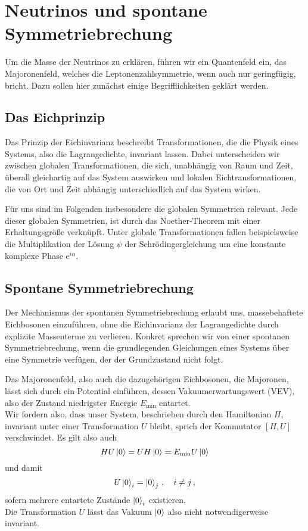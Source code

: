 \section{Neutrinos und spontane Symmetriebrechung}

Um die Masse der Neutrinos zu erklären, führen wir ein Quantenfeld ein, das Majoronenfeld, welches die Leptonenzahlsymmetrie, wenn auch nur geringfügig, bricht.
Dazu sollen hier zunächst einige Begrifflichkeiten geklärt werden.

\subsection{Das Eichprinzip} %

Das Prinzip der Eichinvarianz beschreibt Transformationen, die die Physik eines Systems, also die Lagrangedichte, invariant lassen.
Dabei unterscheiden wir zwischen globalen Transformationen, die sich, unabhängig von Raum und Zeit, überall gleichartig auf das System auswirken und lokalen Eichtransformationen, 
die von Ort und Zeit abhängig unterschiedlich auf das System wirken.

Für uns sind im Folgenden insbesondere die globalen Symmetrien relevant.
Jede dieser globalen Symmetrien, ist durch das Noether-Theorem mit einer Erhaltungsgröße verknüpft.
Unter globale Transformationen fallen beispielsweise die Multiplikation der Lösung $\psi$ der Schrödingergleichung um eine konstante komplexe Phase $\mathrm{e}^{i \alpha}$.

\subsection{Spontane Symmetriebrechung} %


Der Mechanismus der spontanen Symmetriebrechung erlaubt uns, massebehaftete Eichbosonen einzuführen, ohne die Eichinvarianz der Lagrangedichte durch explizite Massenterme zu verlieren.
Konkret sprechen wir von einer spontanen Symmetriebrechung, wenn die grundlegenden Gleichungen eines Systems über eine Symmetrie verfügen, der der Grundzustand nicht folgt.

Das Majoronenfeld, also auch die dazugehörigen Eichbosonen, die Majoronen, lässt sich durch ein Potential einführen, dessen Vakuumerwartungswert (VEV), also der Zustand niedrigster Energie $E_\text{min}$ entartet. \\
Wir fordern also, dass unser System, beschrieben durch den Hamiltonian $H$, invariant unter einer Transformation $U$ bleibt, sprich der Kommutator $[H, U]$ verschwindet.
Es gilt also auch
\begin{equation*}
    H U \ket{0} = U H \ket{0} = E_\text{min} U  \ket{0} 
\end{equation*}
und damit
\begin{equation*}
    U \ket{0}_i = \ket{0}_j \,, \quad i \neq j \,,
\end{equation*}
sofern mehrere entartete Zustände $\ket{0}_i$ existieren. \\
Die Transformation $U$ lässt das Vakuum $\ket{0}$ also nicht notwendigerweise invariant.

